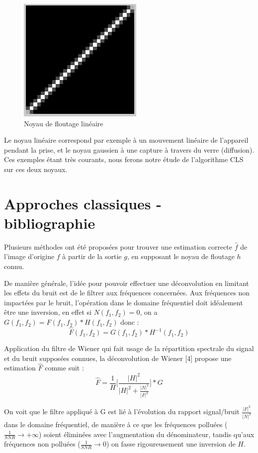 \documentclass{article}
\begin{document}
	
	\begin{figure}[h]
	\begin{center}			
		\includegraphics[scale=0.48]{Img/blurkernel_linear}
	\end{center}
	\caption{Noyau de floutage linéaire}
	\end{figure}

	Le noyau linéaire correspond par exemple à un mouvement linéaire de l'appareil pendant la prise, et le noyau gaussien à une capture à travers du verre (diffusion).
	Ces exemples étant très courants, nous ferons notre étude de l'algorithme CLS sur ces deux noyaux.
	

\section{Approches classiques - bibliographie}
\label{sec:pagestyle}

	Plusieurs méthodes ont été proposées pour trouver une estimation correcte $\hat f$ de l'image d'origine $f$ à partir de la sortie $g$, en supposant le noyau de floutage $h$ connu.
	
	De manière générale, l'idée pour pouvoir effectuer une déconvolution en limitant les effets du bruit est de le filtrer aux fréquences concernées. Aux fréquences non impactées par le bruit, l'opération dans le domaine fréquentiel doit idéalement être une inversion, en effet si $N(f_1,f_2) = 0$, on a $G(f_1,f_2) = \hat F(f_1,f_2) * H(f_1,f_2)$ donc :
	$$\hat F(f_1,f_2) = G(f_1,f_2) * H^{-1}(f_1,f_2)$$
	
	Application du filtre de Wiener qui fait usage de la répartition spectrale du signal et du bruit supposées connues, la déconvolution de Wiener [4] propose une estimation $\hat F$ comme suit :
	$$\hat F = \frac {1}{H} \bigg[ \frac {|H|^2}{|H|^2 + \frac {|N|^2}{|F|^2} } \bigg] * G$$
	
	On voit que le filtre appliqué à G est lié à l'évolution du rapport signal/bruit $\frac{|F|^2}{|N|^2}$ dans le domaine fréquentiel, de manière à ce que les fréquences polluées ($\frac{1}{SNR} { \rightarrow +\infty}$) soient éliminées avec l'augmentation du dénominateur, tandis qu'aux fréquences non polluées ($\frac{1}{SNR} { \rightarrow 0}$) on fasse rigoureusement une inversion de $H$.
	
\end{document}
